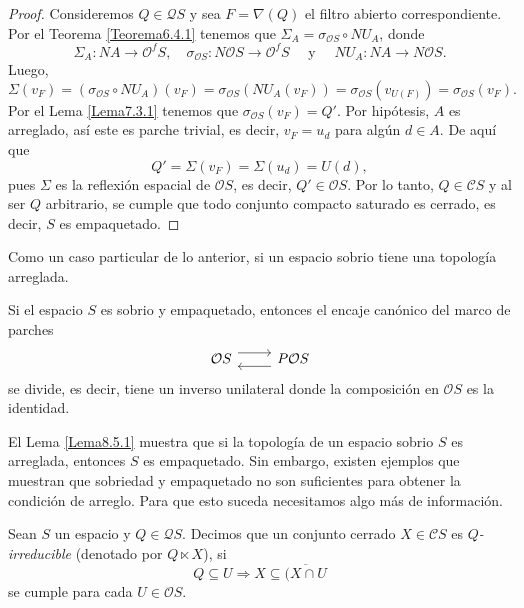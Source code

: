 \begin{proof}
    Consideremos $Q\in\mathcal{Q}S$ y sea $F=\nabla(Q)$ el filtro abierto correspondiente. Por el Teorema \ref{Teorema6.4.1} tenemos que $\Sigma_A=\sigma_{\mathcal{O}S}\circ NU_A$, donde 
    \[
    \Sigma_A\colon NA\to \mathcal{O}^fS,\quad\sigma_{\mathcal{O}S}\colon N\mathcal{O}S\to \mathcal{O}^fS\quad\mbox{ y }\quad NU_A\colon NA\to N\mathcal{O}S.
    \]
    Luego,
    \[
    \Sigma(v_F)=(\sigma_{\mathcal{O}S}\circ NU_A)(v_F)=\sigma_{\mathcal{O}S}(NU_A(v_F))=\sigma_{\mathcal{O}S}(v_{U(F)})=\sigma_{\mathcal{O}S}(v_F).
    \]
    Por el Lema \ref{Lema7.3.1} tenemos que $\sigma_{\mathcal{O}S}(v_F)=Q'$. Por hipótesis, $A$ es arreglado, así este es parche trivial, es decir, $v_F=u_d$ para algún $d\in A$. De aquí que
    \[
    Q'=\Sigma(v_F)=\Sigma(u_d)=U(d),
    \]
    pues $\Sigma$ es la reflexión espacial de $\mathcal{O}S$, es decir, $Q'\in \mathcal{O}S$. Por lo tanto, $Q\in \mathcal{C}S$ y al ser $Q$ arbitrario, se cumple que todo conjunto compacto saturado es cerrado, es decir, $S$ es empaquetado.
\end{proof}

Como un caso particular de lo anterior, si un espacio sobrio tiene una topología arreglada.

\begin{lem}\label{Lema8.5.2}
    Si el espacio $S$ es sobrio y empaquetado, entonces el encaje canónico del marco de parches
    \[\begin{tikzcd}
	{\mathcal{O}S} & {P\mathcal{O}S}
	\arrow[shift left=2, from=1-1, to=1-2]
	\arrow[shift left=2, from=1-2, to=1-1]
\end{tikzcd}\]
se divide, es decir, tiene un inverso unilateral donde la composición en $\mathcal{O}S$ es la identidad.
\end{lem}

El Lema \ref{Lema8.5.1} muestra que si la topología de un espacio sobrio $S$ es arreglada, entonces $S$ es empaquetado. Sin embargo, existen ejemplos que muestran que sobriedad y empaquetado no son suficientes para obtener la condición de arreglo. Para que esto suceda necesitamos algo más de información.

\begin{dfn}\label{Definicion8.5.3}
    Sean $S$ un espacio y $Q\in \mathcal{Q}S$. Decimos que un conjunto cerrado $X\in \mathcal{C}S$ es \emph{$Q$-irreducible} (denotado por $Q\ltimes X$), si 
    \[
    Q\subseteq U\Rightarrow X\subseteq \overline{(X\cap U}
    \]
    se cumple para cada $U\in \mathcal{O}S$.
\end{dfn}

